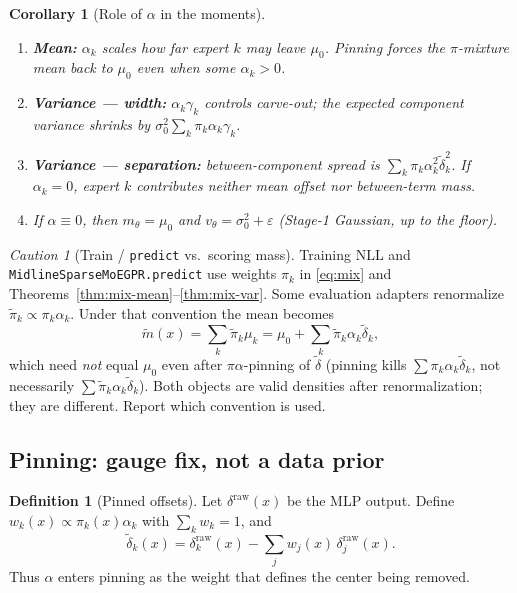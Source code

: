 \documentclass[11pt,a4paper]{article}
\theoremstyle{plain}
\newtheorem{corollary}[theorem]{Corollary}
\theoremstyle{definition}
\newtheorem{definition}[theorem]{Definition}
\theoremstyle{remark}
\newtheorem{caution}[theorem]{Caution}
\newcommand{\tht}{\theta}
\begin{document}
\begin{corollary}[Role of \(\alpha\) in the moments]
\begin{enumerate}[label=(\roman*)]
  \item \textbf{Mean:} \(\alpha_k\) scales how far expert \(k\) may leave \(\mu_0\).
        Pinning forces the \(\pi\)-mixture mean back to \(\mu_0\) even when some
        \(\alpha_k>0\).
  \item \textbf{Variance --- width:} \(\alpha_k\gamma_k\) controls carve-out; the
        expected component variance shrinks by
        \(\sigma_0^2\sum_k\pi_k\alpha_k\gamma_k\).
  \item \textbf{Variance --- separation:} between-component spread is
        \(\sum_k\pi_k\alpha_k^2\tilde\delta_k^2\). If \(\alpha_k=0\), expert \(k\)
        contributes neither mean offset nor between-term mass.
  \item If \(\alpha\equiv 0\), then \(m_\tht=\mu_0\) and
        \(v_\tht=\sigma_0^2+\varepsilon\) (Stage-1 Gaussian, up to the floor).
\end{enumerate}
\end{corollary}

\begin{caution}[Train / \texttt{predict} vs.\ scoring mass]
Training NLL and \texttt{MidlineSparseMoEGPR.predict} use weights \(\pi_k\) in
\eqref{eq:mix} and Theorems~\ref{thm:mix-mean}--\ref{thm:mix-var}.
Some evaluation adapters renormalize
\(\tilde\pi_k\propto\pi_k\alpha_k\). Under that convention the mean becomes
\[
  \tilde m(x)
  =
  \sum_k\tilde\pi_k\mu_k
  =
  \mu_0
  +
  \sum_k\tilde\pi_k\alpha_k\tilde\delta_k,
\]
which need \emph{not} equal \(\mu_0\) even after \(\pi\alpha\)-pinning of
\(\tilde\delta\) (pinning kills \(\sum\pi_k\alpha_k\tilde\delta_k\), not necessarily
\(\sum\tilde\pi_k\alpha_k\tilde\delta_k\)). Both objects are valid densities after
renormalization; they are different. Report which convention is used.
\end{caution}

\subsection{Pinning: gauge fix, not a data prior}
\label{sec:pin}
\begin{definition}[Pinned offsets]
Let \(\delta^{\mathrm{raw}}(x)\) be the MLP output. Define
\(w_k(x)\propto\pi_k(x)\alpha_k\) with \(\sum_k w_k=1\), and
\[
  \tilde\delta_k(x)
  =
  \delta^{\mathrm{raw}}_k(x)
  -
  \sum_j w_j(x)\,\delta^{\mathrm{raw}}_j(x).
\]
Thus \(\alpha\) enters pinning as the weight that defines the center being removed.
\end{definition}
\end{document}
